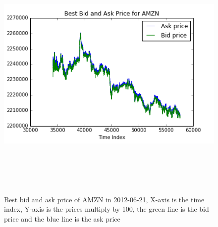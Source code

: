 \begin{figure} [hp]
  \begin{center}
    \includegraphics[width=6in,  height=5in]{figures/AMZN_price.png}
  \end{center}
\caption{Best bid and ask price of AMZN in 2012-06-21,    X-axis is the time index,   Y-axis is the prices multiply by 100,   the green line is the bid price and the blue line is the ask price} \label{fig:amzn_price}
\end{figure}

